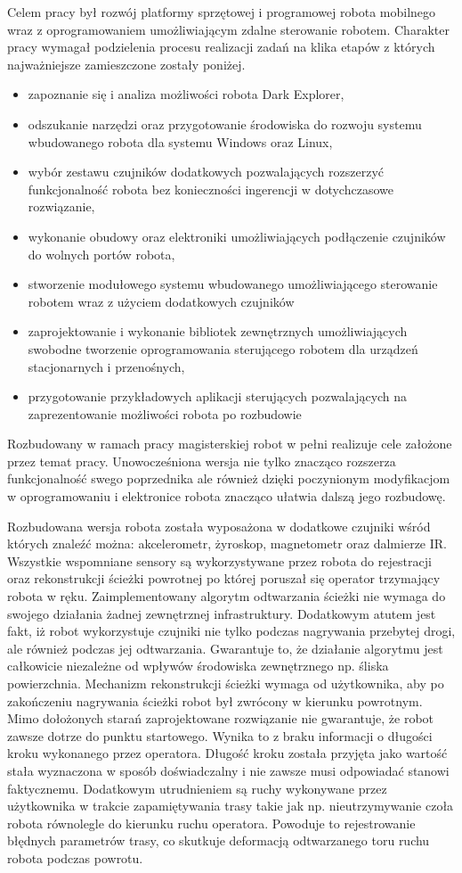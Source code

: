Celem pracy był rozwój platformy sprzętowej i programowej robota mobilnego wraz
z oprogramowaniem umożliwiającym zdalne sterowanie robotem. Charakter pracy
wymagał podzielenia procesu realizacji zadań na klika etapów z których najważniejsze
zamieszczone zostały poniżej.
\begin{itemize}
  \item zapoznanie się i analiza możliwości robota Dark Explorer,
  \item odszukanie narzędzi oraz przygotowanie środowiska do rozwoju systemu
  wbudowanego robota dla systemu Windows oraz Linux,
  \item wybór zestawu czujników dodatkowych pozwalających rozszerzyć
  funkcjonalność robota bez konieczności ingerencji w dotychczasowe rozwiązanie,
  \item wykonanie obudowy oraz elektroniki umożliwiających podłączenie czujników
  do wolnych portów robota, 
  \item stworzenie modułowego systemu wbudowanego umożliwiającego sterowanie
  robotem wraz z użyciem dodatkowych czujników
  \item zaprojektowanie i wykonanie bibliotek zewnętrznych umożliwiających
  swobodne tworzenie oprogramowania sterującego robotem dla urządzeń
  stacjonarnych i przenośnych,
  \item przygotowanie przykładowych aplikacji sterujących pozwalających na
  zaprezentowanie możliwości robota po rozbudowie
\end{itemize}
Rozbudowany w ramach pracy magisterskiej robot w pełni realizuje cele założone
przez temat pracy. Unowocześniona wersja nie tylko znacząco rozszerza
funkcjonalność swego poprzednika ale również dzięki poczynionym modyfikacjom w
oprogramowaniu i elektronice robota znacząco ułatwia dalszą jego rozbudowę.

Rozbudowana wersja robota została wyposażona w dodatkowe czujniki wśród których
znaleźć można: akcelerometr, żyroskop, magnetometr oraz dalmierze IR. Wszystkie
wspomniane sensory są wykorzystywane przez robota do rejestracji
oraz rekonstrukcji ścieżki powrotnej po której poruszał się operator trzymający
robota w ręku. Zaimplementowany algorytm odtwarzania ścieżki nie wymaga do swojego działania
żadnej zewnętrznej infrastruktury. Dodatkowym atutem jest fakt, iż robot
wykorzystuje czujniki nie tylko podczas nagrywania przebytej drogi, ale również
podczas jej odtwarzania. Gwarantuje to, że działanie algorytmu jest całkowicie
niezależne od wpływów środowiska zewnętrznego np. śliska powierzchnia. Mechanizm
rekonstrukcji ścieżki wymaga od użytkownika, aby po zakończeniu
nagrywania ścieżki robot był zwrócony w kierunku powrotnym. Mimo dołożonych
starań zaprojektowane rozwiązanie nie gwarantuje, że robot zawsze dotrze do
punktu startowego. Wynika to z braku informacji o długości kroku wykonanego
przez operatora. Długość kroku została przyjęta jako wartość stała wyznaczona w
sposób doświadczalny i nie zawsze musi odpowiadać stanowi faktycznemu.
Dodatkowym utrudnieniem są ruchy wykonywane przez użytkownika w
trakcie zapamiętywania trasy takie jak np. nieutrzymywanie czoła robota
równolegle do kierunku ruchu operatora. Powoduje to rejestrowanie błędnych
parametrów trasy, co skutkuje deformacją odtwarzanego toru ruchu robota podczas
powrotu. 

